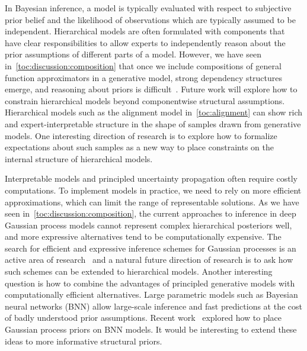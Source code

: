 In Bayesian inference, a model is typically evaluated with respect to subjective prior belief and the likelihood of observations which are typically assumed to be independent.
Hierarchical models are often formulated with components that have clear responsibilities to allow experts to independently reason about the prior assumptions of different parts of a model.
However, we have seen in~\cref{toc:discussion:composition} that once we include compositions of general function approximators in a generative model, strong dependency structures emerge, and reasoning about priors is difficult~\parencite{duvenaud_avoiding_2014}.
Future work will explore how to constrain hierarchical models beyond componentwise structural assumptions.
Hierarchical models such as the alignment model in~\cref{toc:alignment} can show rich and expert-interpretable structure in the shape of samples drawn from generative models.
One interesting direction of research is to explore how to formalize expectations about such samples as a new way to place constraints on the internal structure of hierarchical models.

Interpretable models and principled uncertainty propagation often require costly computations.
To implement models in practice, we need to rely on more efficient approximations, which can limit the range of representable solutions.
As we have seen in~\cref{toc:discussion:composition}, the current approaches to inference in deep Gaussian process models cannot represent complex hierarchical posteriors well, and more expressive alternatives tend to be computationally expensive.
The search for efficient and expressive inference schemes for Gaussian processes is an active area of research~\parencite{salimbeni_orthogonally_2018,shi_sparse_2020,wilson_efficiently_2020} and a natural future direction of research is to ask how such schemes can be extended to hierarchical models.
Another interesting question is how to combine the advantages of principled generative models with computationally efficient alternatives.
Large parametric models such as Bayesian neural networks (BNN) allow large-scale inference and fast predictions at the cost of badly understood prior assumptions.
Recent work~\parencite{sun_functional_2019} explored how to place Gaussian process priors on BNN models.
It would be interesting to extend these ideas to more informative structural priors.
